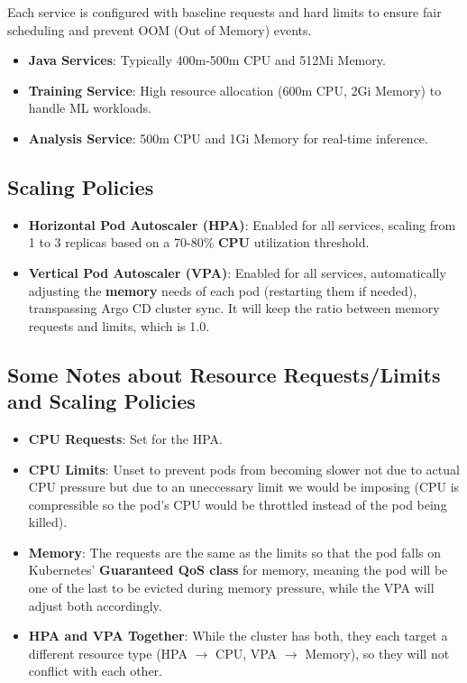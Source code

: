 \documentclass[11pt,a4paper]{article}
\newcommand{\bff}[1]{\textbf{#1}}
\begin{document}
 Each service is configured with baseline requests and hard limits to ensure fair scheduling and prevent OOM (Out of Memory) events.
 \begin{itemize}
  \item \bff{Java Services}: Typically 400m-500m CPU and 512Mi Memory.
  \item \bff{Training Service}: High resource allocation (600m CPU, 2Gi Memory) to handle ML workloads.
  \item \bff{Analysis Service}: 500m CPU and 1Gi Memory for real-time inference.
 \end{itemize}

 \subsection{Scaling Policies}

 \begin{itemize}
  \item \bff{Horizontal Pod Autoscaler (HPA)}: Enabled for all services, scaling from 1 to 3 replicas based on a 70-80\% \bff{CPU} utilization threshold.
  \item \bff{Vertical Pod Autoscaler (VPA)}: Enabled for all services, automatically adjusting the \bff{memory} needs of each pod (restarting them if needed), transpassing Argo CD cluster sync. It will keep the ratio between memory requests and limits, which is 1.0.
 \end{itemize}

 \subsection{Some Notes about Resource Requests/Limits and Scaling Policies}

 \begin{itemize}
  \item \bff{CPU Requests}: Set for the HPA.
  \item \bff{CPU Limits}: Unset to prevent pods from becoming slower not due to actual CPU pressure but due to an uneccessary limit we would be imposing (CPU is compressible so the pod's CPU would be throttled instead of the pod being killed).
  \item \bff{Memory}: The requests are the same as the limits so that the pod falls on Kubernetes' \bff{Guaranteed QoS class} for memory, meaning the pod will be one of the last to be evicted during memory pressure, while the VPA will adjust both accordingly.
  \item \bff{HPA and VPA Together}: While the cluster has both, they each target a different resource type (HPA $\rightarrow$ CPU, VPA $\rightarrow$ Memory), so they will not conflict with each other.
 \end{itemize}
\end{document}
